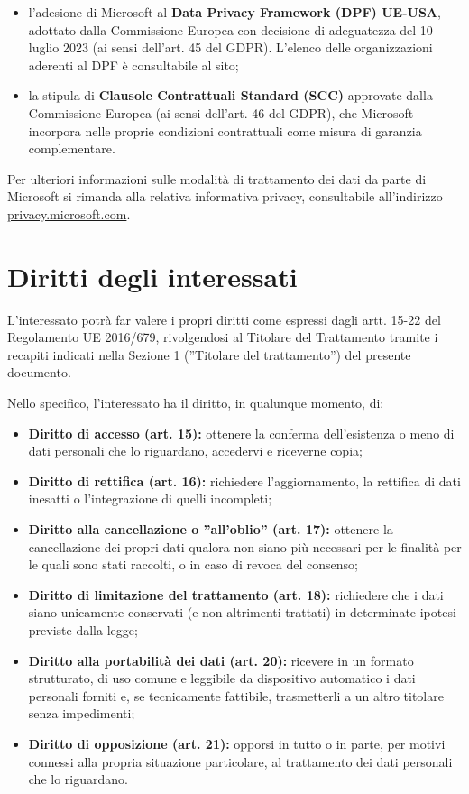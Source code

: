 \documentclass[legal]{polinetwork}
\begin{document}
\begin{itemize}
	\item l'adesione di Microsoft al \textbf{Data Privacy Framework (DPF) UE-USA}, adottato dalla Commissione Europea con decisione di adeguatezza del 10 luglio 2023 (ai sensi dell'art. 45 del GDPR). L'elenco delle organizzazioni aderenti al DPF è consultabile al sito;
	\item la stipula di \textbf{Clausole Contrattuali Standard (SCC)} approvate dalla Commissione Europea (ai sensi dell'art. 46 del GDPR), che Microsoft incorpora nelle proprie condizioni contrattuali come misura di garanzia complementare.
\end{itemize}

Per ulteriori informazioni sulle modalità di trattamento dei dati da parte di Microsoft si rimanda alla relativa informativa privacy, consultabile all'indirizzo \href{https://privacy.microsoft.com}{privacy.microsoft.com}.

\section{Diritti degli interessati}

L'interessato potrà far valere i propri diritti come espressi dagli artt. 15-22 del Regolamento UE 2016/679, rivolgendosi al Titolare del Trattamento tramite i recapiti indicati nella Sezione 1 (”Titolare del trattamento”) del presente documento.

Nello specifico, l'interessato ha il diritto, in qualunque momento, di:
\begin{itemize}
	\item \textbf{Diritto di accesso (art. 15):} ottenere la conferma dell'esistenza o meno di dati personali che lo riguardano, accedervi e riceverne copia;
	\item \textbf{Diritto di rettifica (art. 16):} richiedere l'aggiornamento, la rettifica di dati inesatti o l'integrazione di quelli incompleti;
	\item \textbf{Diritto alla cancellazione o ”all'oblio” (art. 17):} ottenere la cancellazione dei propri dati qualora non siano più necessari per le finalità per le quali sono stati raccolti, o in caso di revoca del consenso;
	\item \textbf{Diritto di limitazione del trattamento (art. 18):} richiedere che i dati siano unicamente conservati (e non altrimenti trattati) in determinate ipotesi previste dalla legge;
	\item \textbf{Diritto alla portabilità dei dati (art. 20):} ricevere in un formato strutturato, di uso comune e leggibile da dispositivo automatico i dati personali forniti e, se tecnicamente fattibile, trasmetterli a un altro titolare senza impedimenti;
	\item \textbf{Diritto di opposizione (art. 21):} opporsi in tutto o in parte, per motivi connessi alla propria situazione particolare, al trattamento dei dati personali che lo riguardano.
\end{itemize}
\end{document}
